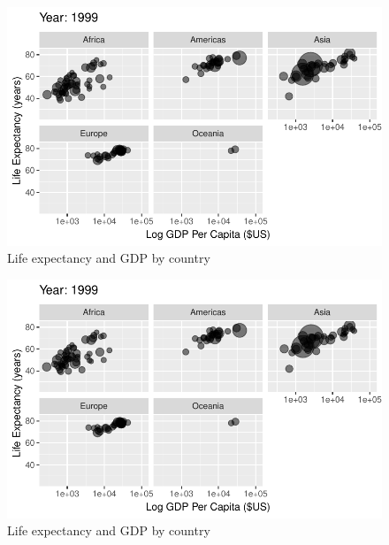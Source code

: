 \documentclass[
  letterpaper,
  DIV=11,
  numbers=noendperiod]{scrreport}
\theoremstyle{definition}
\theoremstyle{remark}
\begin{document}
\begin{figure}

{\centering \includegraphics{index_files/figure-pdf/fig-anim-lifegdp-85.pdf}

}

\caption{\label{fig-anim-lifegdp-85}Life expectancy and GDP by country}

\end{figure}

\begin{figure}

{\centering \includegraphics{index_files/figure-pdf/fig-anim-lifegdp-86.pdf}

}

\caption{\label{fig-anim-lifegdp-86}Life expectancy and GDP by country}

\end{figure}
\end{document}

